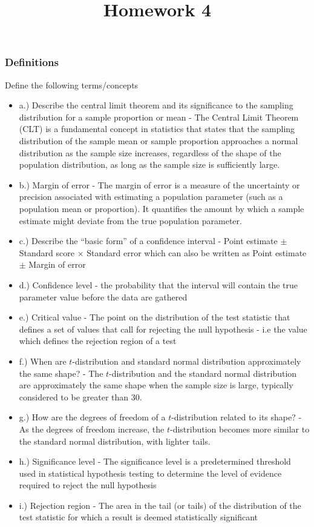 \documentclass[
]{article}
\title{Homework 4}
\author{}
\date{\vspace{-2.5em}}
\begin{document}
\maketitle

\subsubsection{Definitions}\label{definitions}

Define the following terms/concepts

\begin{itemize}
\item
  a.) Describe the central limit theorem and its significance to the
  sampling distribution for a sample proportion or mean - {The Central
  Limit Theorem (CLT) is a fundamental concept in statistics that states
  that the sampling distribution of the sample mean or sample proportion
  approaches a normal distribution as the sample size increases,
  regardless of the shape of the population distribution, as long as the
  sample size is sufficiently large.}
\item
  b.) Margin of error - {The margin of error is a measure of the
  uncertainty or precision associated with estimating a population
  parameter (such as a population mean or proportion). It quantifies the
  amount by which a sample estimate might deviate from the true
  population parameter.}
\item
  c.) Describe the ``basic form'' of a confidence interval - {Point
  estimate \(\pm\) Standard score \(\times\) Standard error} which can
  also be written as {Point estimate \(\pm\) Margin of error}
\item
  d.) Confidence level - {the probability that the interval will contain
  the true parameter value before the data are gathered}
\item
  e.) Critical value - {The point on the distribution of the test
  statistic that defines a set of values that call for rejecting the
  null hypothesis - i.e the value which defines the rejection region of
  a test}
\item
  f.) When are \(t\)-distribution and standard normal distribution
  approximately the same shape? - {The \(t\)-distribution and the
  standard normal distribution are approximately the same shape when the
  sample size is large, typically considered to be greater than 30. }
\item
  g.) How are the degrees of freedom of a \(t\)-distribution related to
  its shape? - {As the degrees of freedom increase, the
  \(t\)-distribution becomes more similar to the standard normal
  distribution, with lighter tails.}
\item
  h.) Significance level - {The significance level is a predetermined
  threshold used in statistical hypothesis testing to determine the
  level of evidence required to reject the null hypothesis}
\item
  i.) Rejection region - { The area in the tail (or tails) of the
  distribution of the test statistic for which a result is deemed
  statistically significant}
\end{itemize}
\end{document}
